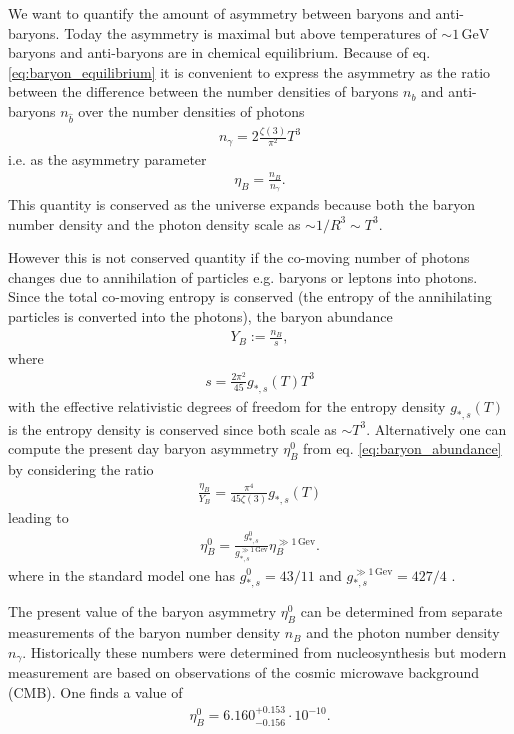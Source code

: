 \documentclass[13pt,a4paper,titlepage]{article}
\begin{document}
We want to quantify the amount of asymmetry between baryons and anti-baryons.
Today the asymmetry is maximal but
above temperatures of $\sim 1 \, \mathrm{GeV}$ baryons and anti-baryons are in chemical equilibrium.
Because of eq. \eqref{eq:baryon_equilibrium} it is convenient to express the asymmetry as
the ratio between the difference between the number densities of baryons $n_b$ and anti-baryons $n_{\hat{b}}$
over the number densities of photons \cite[eq. 3.52]{the_early_universe_kolb_and_turner}
\begin{align}
    n_\gamma = 2 \frac{\zeta(3)}{\pi^2} T^3
\end{align}
i.e. as the asymmetry parameter \cite[eq. 1.2]{Cline:2006ts_Baryogenesis}
\begin{align}
    \eta_B = \frac{n_B}{n_\gamma}.
\end{align}
This quantity is conserved as the universe expands because both the baryon number density
and the photon density scale as $\sim 1/R^3 \sim T^3$.

However this is not conserved quantity if the co-moving number of photons changes due to annihilation
of particles e.g. baryons or leptons into photons.
Since the total co-moving entropy is conserved (the entropy of the annihilating particles is converted into the photons), the baryon abundance
\begin{align}
    \label{eq:baryon_abundance}
    Y_B := \frac{n_B}{s},
\end{align}
where
\begin{align}
    s = \frac{2 \pi^2}{45} g_{*, s}(T) T^3
\end{align}
with the effective relativistic degrees of freedom for the entropy density $g_{*, s}(T)$
is the entropy density
is conserved since both scale as $\sim T^3$.
Alternatively one can compute the present day baryon asymmetry $\eta_B^0$ from eq. \eqref{eq:baryon_abundance} by considering the ratio
\begin{align}
    \frac{\eta_B}{Y_B} = \frac{\pi^4}{45 \zeta(3)} g_{*, s}(T)
\end{align}
leading to
\begin{align}
    \label{eq:asymmetry_redshift}
    \eta_B^0 = \frac{g_{*,s}^0}{g_{*, s}^{\gg 1 \, \mathrm{Gev}}} \eta_B^{\gg 1 \, \mathrm{Gev}}.
\end{align}
where in the standard model one has $g_{*,s}^0 = 43/11$ and $g_{*, s}^{\gg 1 \, \mathrm{Gev}} = 427/4$ \cite[sec. 3.4]{the_early_universe_kolb_and_turner}.

The present value of the baryon asymmetry $\eta_B^0$ can be determined from separate measurements
of the baryon number density $n_B$ and the photon number density $n_\gamma$.
Historically these numbers were determined from nucleosynthesis \cite[sec. III.1]{Matter_and_Antimatter_Canetti_2012} but modern measurement are based on observations of the cosmic microwave background (CMB).
One finds a value of \cite[eq. 7]{Matter_and_Antimatter_Canetti_2012}
\begin{align}
    \eta_B^0 = 6.160^{+ 0.153}_{-0.156} \cdot 10^{-10}.
\end{align}
\end{document}
